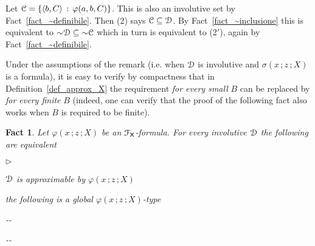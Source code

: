 \documentclass{amsproc}
\makeatletter
\newcommand{\mylabel}[1]{{#1}\hfill}
\renewenvironment{itemize}
  {\begin{list}{$\triangleright$}{%
  \setlength{\parskip}{0mm}
  \setlength{\topsep}{.1\baselineskip}
  \setlength{\rightmargin}{0mm}
  \setlength{\listparindent}{0mm}
  \setlength{\itemindent}{0mm}
  \setlength{\labelwidth}{3ex}
  \setlength{\itemsep}{.1\baselineskip}
  \setlength{\parsep}{.1\baselineskip}
  \setlength{\partopsep}{0mm}
  \setlength{\labelsep}{1ex}
  \setlength{\leftmargin}{\labelwidth+\labelsep}
  \let\makelabel\mylabel}}{%
\end{list}}
\newcounter{thm}
\theoremstyle{mio}
\newtheorem{fact}[thm]{Fact}\tcolorboxenvironment{fact}{mythm}
\providecommand{\proofNameStyle}{\bfseries}
\renewenvironment{proof}[1][\proofname]{\par
  \pushQED{\qed}%
  \normalfont%
  \trivlist
  \item[\hskip\labelsep
        \proofNameStyle
    #1\@addpunct{.}]\ignorespaces
}{%
  \popQED\endtrivlist\@endpefalse
}
\makeatother
\begin{document}
\begin{proof}
  Let ${\EuScript C}=\{\langle b,C\rangle\,:\,\varphi(a,b,C)\}$.
  This is also an involutive set by Fact~\ref{fact_~definibile}.
  Then (2) says ${\EuScript C}\subseteq{\EuScript D}$.
  By Fact~\ref{fact_~inclusione} this is equivalent to ${\sim}{\EuScript D}\subseteq{\sim}{\EuScript C}$ which in turn is equivalent to (2$'$), again by Fact~\ref{fact_~definibile}.
\end{proof}

Under the assumptions of the remark (i.e. when ${\EuScript D}$ is involutive and $\sigma(x\,;z\,;X)$ is a formula), it is easy to verify by compactness that in Definition~\ref{def_approx_X} the requirement \textit{for every small\/} $B$ can be replaced by \textit{for every finite\/} $B$ (indeed, one can verify that the proof of the following fact also works when $B$ is required to be finite).

\begin{fact}
  Let $\varphi(x\,;z\,;X)$ be an ${\EuScript F}_{\sf X}$-formula.
  For every involutive ${\EuScript D}$ the following are equivalent
  \begin{itemize}
    \item [1.] ${\EuScript D}$ is approximable by $\varphi(x\,;z\,;X)$
    \item [2.] the following is a global $\varphi(x\,;z\,;X)$-type\smallskip
    
    \noindent\kern-\kern-
    \smallskip

    \noindent\kern-\kern-
  
  \end{itemize}
\end{fact}
\end{document}
